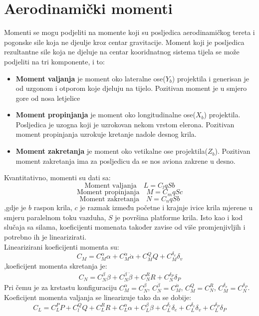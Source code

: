 \section{Aerodinamički momenti}
Momenti se mogu podjeliti na momente koji su posljedica aerodinamičkog tereta i 
pogonske sile koja ne djeulje kroz centar gravitacije. Moment koji je posljedica 
rezultantne sile koja ne djeluje na centar kooridnatnog sistema tijela se može 
podjeliti na tri komponente, i to:
\begin{itemize}
    \item \textbf{Moment valjanja} je moment oko lateralne ose($Y_b$) projektila i generisan 
    je od uzgonom i otporom koje djeluju na tijelo. Pozitivan moment je u smjero gore 
    od nosa letjelice 
    
    \item \textbf{Moment propinjanja} je moment oko longitudinalne ose($X_b$) projektila.
    Posljedica je uzogna koji je uzrokovan nekom vrstom elerona. Pozitivan moment propinjanja uzrokuje kretanje nadole 
    desnog krila.
    
    \item \textbf{Moment zakretanja} je moment oko vetikalne ose projektila($Z_b$). Pozitivan moment zakretanja 
    ima za posljedicu da se nos aviona zakrene u desno. 
\end{itemize}
Kvantitativno, momenti su dati sa:
\begin{equation}
    \text{Moment valjanja} \quad L=C_lqSb
    \label{eq:a1}
 \end{equation}
 \begin{equation}
     \text{Moment propinjanja} \quad M=C_mqSc
     \label{eq:a2}
 \end{equation}
 \begin{equation}
     \text{Moment zakretanja} \quad N=C_nqSb
     \label{eq:a3}
 \end{equation}
 ,gdje je $b$ raspon krila, $c$ je razmak između početne i krajnje ivice krila mjerene 
 u smjeru paralelnom toku vazduha, $S$ je površina platforme krila. 
 Isto kao i kod slučaja sa silama, koeficijenti momenata također zavise od više promjenjivljih 
 i potrebno ih je linearizirati. \\
 Linearizirani koeficijenti momenta  su:
 \begin{equation}
     C_M=C_M^{\alpha}\alpha +C_M^{\dot{\alpha}}\dot{\alpha} + C_M^Q Q+C_M^{\delta _v}\delta _v
 \end{equation}
 ,koeficijent momenta skretanja je:
 \begin{equation}
     C_N=C_N^{\beta}\beta + C_N^{\dot{\beta}}\dot{\beta}+C_N^R R+C_N^{\delta _P}\delta _P
 \end{equation} 
 Pri čemu je za krstastu konfiguraciju $C_M^{\alpha}=C_N^{\beta}$, $C_N^{\dot{\beta}}=C_M^{\dot{\alpha}}$,
 $ C_M^Q=C_N^R $, $C_M^{\delta _v}=C_N^{\delta _P}$.
 Koeficijent momenta valjanja se linearizuje tako da se dobije:
 \begin{equation}
     C_L = C_L^PP+C_l^QQ+C_L^RR +C_L^\alpha \alpha +C_L^\beta \beta + C_L^{\delta _e} \delta _e +C_L^{\delta _v} \delta _v
     +C_L^{\delta _P} \delta _P
 \end{equation}